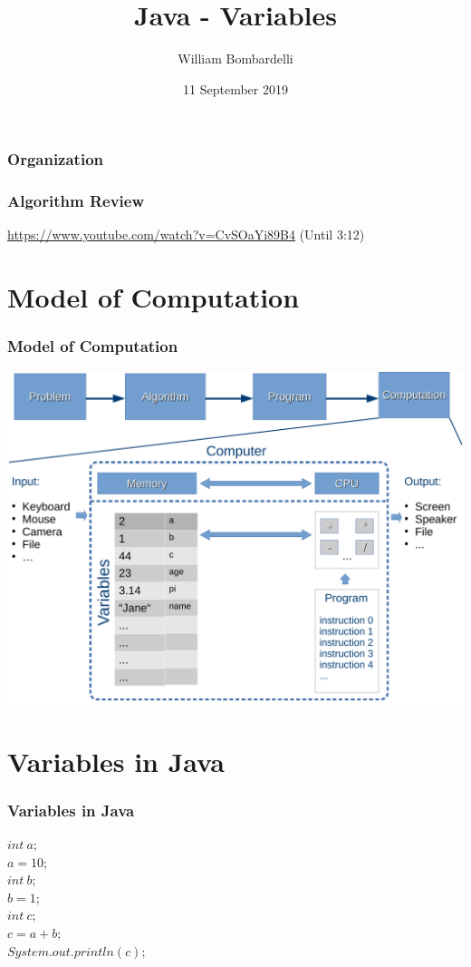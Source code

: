\documentclass{beamer}
\title[Java]{Java - Variables}
\author[W. Bombardelli]{William Bombardelli}
\institute[Schweizerschule Mexiko]
{
	\vskip 12pt
	Schweizerschule Mexiko, Ciudad de México, Mexico \\
	\texttt{E-Mail...}
}
\date{11 September 2019}
\begin{document}
	\begin{frame}
		\titlepage
	\end{frame}
	
	\begin{frame}
		\frametitle{Organization}
		\tableofcontents
	\end{frame}

	\begin{frame}
		\frametitle{Algorithm Review}
		\url{https://www.youtube.com/watch?v=CvSOaYi89B4} (Until 3:12)
	\end{frame}
	
	\section{Model of Computation}
	\begin{frame}
		\frametitle{Model of Computation}
		\centering
		\vspace{-4px}
		\includegraphics[width=.9\textwidth]{Memory-CPU-Scheme}
	\end{frame}

	\section{Variables in Java}

	\begin{frame}
		\frametitle{Variables in Java}
		$int\ a;$\\
		$a = 10;$\\
		$int\ b;$\\
		$b = 1;$\\
		$int\ c;$\\
		$c = a + b;$\\
		$System.out.println(c);$
	\end{frame}
\end{document}
